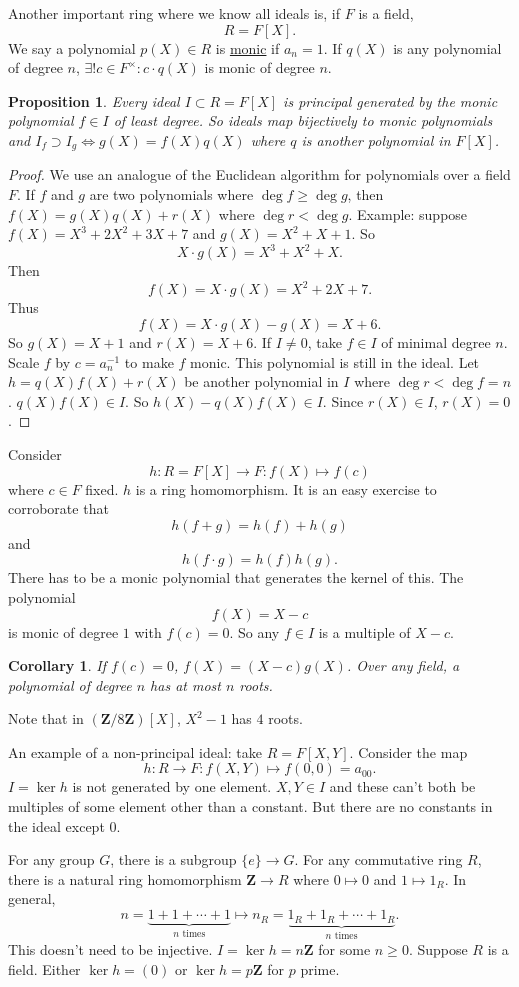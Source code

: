 \documentclass[11pt, oneside]{amsart}
\numberwithin{equation}{section}
\numberwithin{theorem}{section}
\newtheorem{corollary}[theorem]{Corollary}
\newtheorem{proposition}[theorem]{Proposition}
\theoremstyle{definition}
\def\Z{\mathbf{Z}}
\begin{document}
{Another important ring where we know all ideals is, if $F$ is a field, 
$$
R = F[X]. 
$$
We say a polynomial $p(X)\in R$ is \underline{monic} if $a_n = 1$. If $q(X)$ is any polynomial of degree $n$, $\exists! c\in F^\times: c\cdot q(X) $ is monic of degree $n$.
\begin{proposition}
Every ideal $I\subset R=F[X]$ is principal generated by the monic polynomial $f\in I$ of least degree. So ideals map bijectively to monic polynomials  and $I_f\supset I_g\iff g(X) = f(X)q(X)$ where $q$ is another polynomial in $F[X]$.
\end{proposition}
\begin{proof}
We use an analogue of the Euclidean algorithm for polynomials over a field $F$. If $f$ and $g$ are two polynomials where $\deg f \geqslant \deg g$, then $f(X)=g(X)q(X) + r(X)$ where $\deg r < \deg g$. Example: suppose $f(X) = X^3 + 2X^2+3X+7$ and $g(X) = X^2 + X +1$. So 
$$
X\cdot g(X) = X^3 +X^2 + X.
$$
Then 
$$
f(X) = X\cdot g(X) = X^2 + 2X + 7.
$$
Thus
$$
f(X) = X\cdot g(X) - g(X) = X + 6.
$$
So $g(X) = X+1$ and $r(X) = X+6$. If $I\neq 0$, take $f\in I$ of minimal degree $n$. Scale $f$ by $c = a_n^{-1}$ to make $f$ monic. This polynomial is still in the ideal. Let $h = q(X)f(X) + r(X)$ be another polynomial in $I$ where $\deg r < \deg f = n$. $q(X)f(X)\in I$. So $h(X) - q(X)f(X)\in I$. Since $r(X)\in I$, $r(X) = 0$.
\end{proof}

Consider 
$$
h : R = F[X] \to F : f(X) \mapsto f(c)
$$
where $c\in F$ fixed. $h$ is a ring homomorphism. It is an easy exercise to corroborate that
$$
h(f+g) = h(f) + h(g)
$$
and 
$$
h(f\cdot g) = h(f) h(g).
$$
There has to be a monic polynomial that generates the kernel of this. The polynomial 
$$
f(X) = X-c
$$
is monic of degree $1$ with $f(c) = 0$. So any $f\in I$ is a multiple of $X-c$.
\begin{corollary}
If $f(c) = 0$, $f(X) = (X-c)g(X)$. Over any field, a polynomial of degree $n$ has at most $n$ roots.
\end{corollary} 

Note that in $(\Z/8\Z)[X]$, $X^2-1$ has $4$ roots. 

An example of a non-principal ideal: take $R=F[X,Y]$. Consider the map 
$$
h : R\to F : f(X,Y)\mapsto f(0,0) = a_{00}.
$$
$I=\ker h$ is not generated by one element. $X,Y\in I$ and these can't both be multiples of some element other than a constant. But there are no constants in the ideal except $0$. 

For any group $G$, there is a subgroup $\{e\}\to G$. For any commutative ring $R$, there is a natural ring homomorphism $\Z\to R$ where $0\mapsto 0$ and $1\mapsto 1_R$. In general,
$$
n = \underbrace{1+ 1+\cdots + 1}_{n \textrm{ times}} \mapsto n_R = \underbrace{1_R + 1_R+\cdots +1_R}_{n \textrm{ times}}.
$$
This doesn't need to be injective. $I = \ker h =n\Z$ for some $n\geqslant 0$. Suppose $R$ is a field. Either $\ker h = (0)$ or $\ker h = p\Z$ for $p$ prime. 

}
\end{document}
